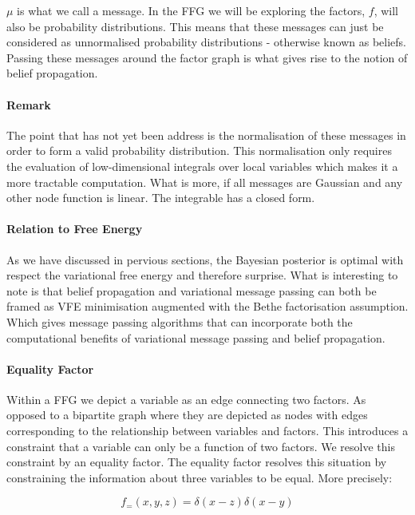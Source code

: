 \documentclass{article}
\begin{document}
$\mu$ is what we call a message. In the FFG we will be exploring the factors, $f$, will also be probability distributions. This means that these messages can just be considered as unnormalised probability distributions - otherwise known as beliefs. Passing these messages around the factor graph is what gives rise to the notion of belief propagation.


\paragraph{Remark} The point that has not yet been address is the normalisation of these messages in order to form a valid probability distribution. This normalisation only requires the evaluation of low-dimensional integrals over local variables which makes it a more tractable computation. What is more, if all messages are Gaussian and any other node function is linear. The integrable has a closed form. \citep{bagaev2021reactive}

\paragraph{Relation to Free Energy} As we have discussed in pervious sections, the Bayesian posterior is optimal with respect the variational free energy and therefore surprise. What is interesting to note is that belief propagation and variational message passing \citep{winn2005variational} can both be framed as VFE minimisation augmented with the Bethe factorisation assumption. \citep{yedida2005constructing} Which gives message passing algorithms that can incorporate both the computational benefits of variational message passing and belief propagation. \citep{bagaev2021reactive} 

\paragraph{Equality Factor} Within a FFG we depict a variable as an edge connecting two factors. As opposed to a bipartite graph where they are depicted as nodes with edges corresponding to the relationship between variables and factors. This introduces a constraint that a variable can only be a function of two factors. We resolve this constraint by an equality factor. The equality factor resolves this situation by constraining the information about three variables to be equal. 	\citep{cox2019factor} More precisely:

\begin{equation}\label{eq:equality_factor}
	f_{=}(x, y, z) = \delta(x - z)\delta(x - y)
\end{equation}
\end{document}
